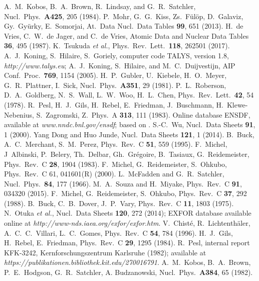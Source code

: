 \begin{thebibliography}{}
A.\ M.\ Kobos, B.\ A.\ Brown, R.\ Lindsay, and G.\ R.\ Satchler,
Nucl.\ Phys.\ {\bf A425}, 205 (1984).
%
P.\ Mohr, G.\ G.\ Kiss, Zs.\ F\"ul\"op, D.\ Galaviz, Gy.\ Gy\"urky, 
E.\ Somorjai,
At.\ Data Nucl.\ Data Tables {\bf 99}, 651 (2013).
%
H.\ de Vries, C.\ W.\ de Jager, and C.\ de Vries,
        Atomic Data and Nuclear Data Tables {\bf 36}, 495 (1987).
%
K.\ Tsukuda {\it et al.},
Phys.\ Rev.\ Lett.\ {\bf 118}, 262501 (2017).
%
A.\ J.\ Koning, S.\ Hilaire, S.\ Goriely,
computer code TALYS, version 1.8,
{\it{http://www.talys.eu}};
A.\ J.\ Koning, S.\ Hilaire, and M.\ C.\ Duijvestijn,
AIP Conf.\ Proc.\ \textbf{769}, 1154 (2005).
%
H.\ P.\ Gubler, U.\ Kiebele, H.\ O.\ Meyer, G.\ R.\ Plattner, I.\ Sick,
Nucl.\ Phys.\ {\bf A351}, 29 (1981).
%
P.\ L.\ Roberson, D.\ A.\ Goldberg, N.\ S.\ Wall, L.\ W.\ Woo, H.\ L.\ Chen,
Phys.\ Rev.\ Lett.\ {\bf 42}, 54 (1978).
%
R.\ Pesl, H.\ J.\ Gils, H.\ Rebel, E.\ Friedman, J.\ Buschmann,
H.\ Klewe-Nebenius, S.\ Zagromski,
Z.\ Phys.\ A {\bf 313}, 111 (1983).
%
Online database ENSDF,
available at {\it{www.nndc.bnl.gov/ensdf}};
based on \cite{NDS46,NDS54}.
%
S.-C.\ Wu,
Nucl.\ Data Sheets {\bf 91}, 1 (2000).
%
Yang Dong and Huo Junde,
Nucl.\ Data Sheets {\bf 121}, 1 (2014).
%
B.\ Buck, A.\ C.\ Merchant, S.\ M.\ Perez,
Phys.\ Rev.\ C {\bf 51}, 559 (1995).
%
F.\ Michel, J\ Albinski, P.\ Belery, Th.\ Delbar, Gh.\ Gr{\'e}goire,
B.\ Tasiaux, G.\ Reidemeister,
Phys.\ Rev.\ C {\bf 28}, 1904 (1983).
%
F.\ Michel, G.\ Reidemeister, S.\ Ohkubo,
Phys.\ Rev.\ C 61, 041601(R) (2000).
%
L.\ McFadden and G.\ R.\ Satchler, 
Nucl.\ Phys.\ {\bf 84}, 177 (1966).
%
M.\ A.\ Souza and H.\ Miyake,
Phys.\ Rev.\ C {\bf 91}, 034320 (2015).
%
F.\ Michel, G.\ Reidemeister, S.\ Ohkubo,
Phys.\ Rev.\ C {\bf 37}, 292 (1988).
%
B.\ Buck, C.\ B.\ Dover, J.\ P.\ Vary,
Phys.\ Rev.\ C {\bf 11}, 1803 (1975).
%
N.\ Otuka {\it et al.},
Nucl.\ Data Sheets {\bf 120}, 272 (2014);
EXFOR database available online at
{\it{http://www-nds.iaea.org/exfor/exfor.htm}}.
%
V.\ Chist{\'e}, R.\ Lichtenth{\"a}ler, A.\ C.\ C.\ Villari, L.\ C.\ Gomes,
Phys.\ Rev.\ C {\bf 54}, 784 (1996).
%
H.\ J.\ Gils, H.\ Rebel, E.\ Friedman,
Phys.\ Rev.\ C {\bf 29}, 1295 (1984).
%
R.\ Pesl,
internal report KFK-3242, Kernforschungszentrum Karlsruhe (1982); available at
{\it{https://publikationen.bibliothek.kit.edu/270016791}}.
%
A.\ M.\ Kobos, B.\ A.\ Brown, P.\ E.\ Hodgson, G.\ R.\ Satchler,
A. Budzanowski,
Nucl.\ Phys.\ {\bf A384}, 65 (1982).
%
\end{thebibliography}



